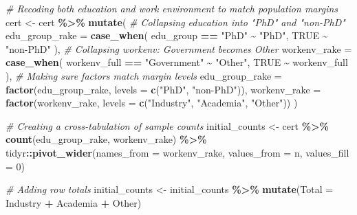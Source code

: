\documentclass[]{article}
\newenvironment{Shaded}{\begin{snugshade}}{\end{snugshade}}
\newcommand{\AttributeTok}[1]{\textcolor[rgb]{0.13,0.29,0.53}{#1}}
\newcommand{\CommentTok}[1]{\textcolor[rgb]{0.56,0.35,0.01}{\textit{#1}}}
\newcommand{\ConstantTok}[1]{\textcolor[rgb]{0.56,0.35,0.01}{#1}}
\newcommand{\DecValTok}[1]{\textcolor[rgb]{0.00,0.00,0.81}{#1}}
\newcommand{\FunctionTok}[1]{\textcolor[rgb]{0.13,0.29,0.53}{\textbf{#1}}}
\newcommand{\NormalTok}[1]{#1}
\newcommand{\OtherTok}[1]{\textcolor[rgb]{0.56,0.35,0.01}{#1}}
\newcommand{\SpecialCharTok}[1]{\textcolor[rgb]{0.81,0.36,0.00}{\textbf{#1}}}
\newcommand{\StringTok}[1]{\textcolor[rgb]{0.31,0.60,0.02}{#1}}
\begin{document}
\begin{Shaded}
\begin{Highlighting}[]
\CommentTok{\# Recoding both education and work environment to match population margins }
\NormalTok{cert }\OtherTok{\textless{}{-}}\NormalTok{ cert }\SpecialCharTok{\%\textgreater{}\%}
  \FunctionTok{mutate}\NormalTok{(}
     \CommentTok{\# Collapsing education into "PhD" and "non{-}PhD"}
    \AttributeTok{edu\_group\_rake =} \FunctionTok{case\_when}\NormalTok{(}
\NormalTok{      edu\_group }\SpecialCharTok{==} \StringTok{"PhD"} \SpecialCharTok{\textasciitilde{}} \StringTok{"PhD"}\NormalTok{,}
      \ConstantTok{TRUE} \SpecialCharTok{\textasciitilde{}} \StringTok{"non{-}PhD"}
\NormalTok{    ),}
    \CommentTok{\# Collapsing workenv: Government becomes Other}
    \AttributeTok{workenv\_rake =} \FunctionTok{case\_when}\NormalTok{(}
\NormalTok{      workenv\_full }\SpecialCharTok{==} \StringTok{"Government"} \SpecialCharTok{\textasciitilde{}} \StringTok{"Other"}\NormalTok{,}
      \ConstantTok{TRUE} \SpecialCharTok{\textasciitilde{}}\NormalTok{ workenv\_full}
\NormalTok{    ),}
    \CommentTok{\# Making sure factors match margin levels}
    \AttributeTok{edu\_group\_rake =} \FunctionTok{factor}\NormalTok{(edu\_group\_rake, }\AttributeTok{levels =} \FunctionTok{c}\NormalTok{(}\StringTok{"PhD"}\NormalTok{, }\StringTok{"non{-}PhD"}\NormalTok{)),}
    \AttributeTok{workenv\_rake =} \FunctionTok{factor}\NormalTok{(workenv\_rake, }\AttributeTok{levels =} \FunctionTok{c}\NormalTok{(}\StringTok{"Industry"}\NormalTok{, }\StringTok{"Academia"}\NormalTok{, }
                                                    \StringTok{"Other"}\NormalTok{))}
\NormalTok{  )}

\CommentTok{\# Creating a cross{-}tabulation of sample counts}
\NormalTok{initial\_counts }\OtherTok{\textless{}{-}}\NormalTok{ cert }\SpecialCharTok{\%\textgreater{}\%}
  \FunctionTok{count}\NormalTok{(edu\_group\_rake, workenv\_rake) }\SpecialCharTok{\%\textgreater{}\%}
\NormalTok{  tidyr}\SpecialCharTok{::}\FunctionTok{pivot\_wider}\NormalTok{(}\AttributeTok{names\_from =}\NormalTok{ workenv\_rake, }\AttributeTok{values\_from =}\NormalTok{ n, }\AttributeTok{values\_fill =} \DecValTok{0}\NormalTok{)}

\CommentTok{\# Adding row totals}
\NormalTok{initial\_counts }\OtherTok{\textless{}{-}}\NormalTok{ initial\_counts }\SpecialCharTok{\%\textgreater{}\%}
  \FunctionTok{mutate}\NormalTok{(}\AttributeTok{Total =}\NormalTok{ Industry }\SpecialCharTok{+}\NormalTok{ Academia }\SpecialCharTok{+}\NormalTok{ Other)}


\end{Highlighting}
\end{Shaded}
\end{document}
